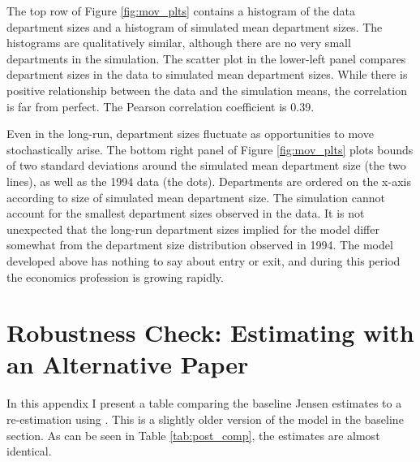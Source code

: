 The top row of Figure \ref{fig:mov_plts} contains a histogram of the data department sizes
and a histogram of simulated mean department sizes.  The histograms are qualitatively similar,
although there are no very small departments in the simulation.  The scatter plot in the 
lower-left panel compares department sizes in the data to simulated mean department sizes.
While there is positive relationship between the data and the simulation
means, the correlation is far from perfect. The Pearson correlation coefficient is 0.39.

Even in the long-run, department sizes fluctuate as opportunities to move stochastically
arise.  The bottom right panel of Figure \ref{fig:mov_plts} plots bounds
of two standard deviations around the simulated mean department size (the two lines), as well
as the 1994 data (the dots).  Departments are ordered on the x-axis according to size of
simulated mean department size.  The simulation cannot account for 
the smallest department sizes observed in the data.  It is not unexpected that the long-run department sizes
implied for the model differ somewhat from the
department size distribution observed in 1994.  The model
developed above has nothing to say about entry or exit, and during this period the economics
profession is growing rapidly.

\section{Robustness Check: Estimating with an Alternative Paper}
\label{sec:gross}

In this appendix I present a table comparing the baseline Jensen estimates to a re-estimation using
\citet{grossman1986costs}.  This is a slightly older version of the model in the baseline section.  As can be seen in Table \ref{tab:post_comp}, the estimates are almost 
identical.

